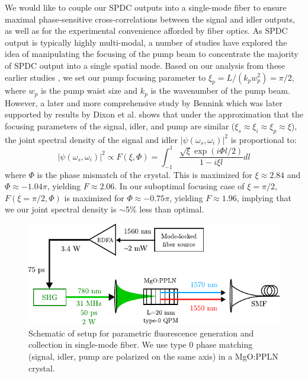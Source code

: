We would like to couple our SPDC outputs into a single-mode fiber to ensure maximal phase-sensitive cross-correlations between the signal and idler outputs, as well as for the experimental convenience afforded by fiber optics. As SPDC output is typically highly multi-modal, a number of studies \cite{ljunggren-focus,kurtsiefer-spdc,bovino-focus,bennink-focus,fedrizzi-focus,boyd-focus} have explored the idea of manipulating the focusing of the pump beam to concentrate the majority of SPDC output into a single spatial mode. Based on our analysis from these earlier studies \cite{legouet-interferometry}, we set our pump focusing parameter to $\xi_p = L/(k_p w_p^2) = \pi/2$, where $w_p$ is the pump waist size and $k_p$ is the wavenumber of the pump beam. However, a later and more comprehensive study by Bennink \cite{bennink-optimal} which was later supported by results by Dixon et al. \cite{dixon-heralding} shows that under the approximation that the focusing parameters of the signal, idler, and pump are similar ($\xi_s \approx \xi_i \approx \xi_p \approx \xi$), the joint spectral density of the signal and idler $|\psi(\omega_s, \omega_i)|^2$ is proportional to:
\begin{equation}
|\psi(\omega_s, \omega_i)|^2 \propto F(\xi,\Phi) = \int_{-1}^1 \frac{\sqrt{\xi} \exp(i\Phi l/2)}{1-i\xi l} dl
\end{equation}
where $\Phi$ is the phase mismatch of the crystal. This is maximized for $\xi \approx 2.84$ and $\Phi \approx -1.04\pi$, yielding $F \approx 2.06$. In our suboptimal focusing case of $\xi = \pi/2$, $F(\xi = \pi/2, \Phi)$ is maximized for $\Phi \approx -0.75\pi$, yielding $F \approx 1.96$, implying that we our joint spectral density is $\sim$5\% less than optimal.

\begin{figure}[t]
\begin{center}
\includegraphics[width=13cm]{figure-pcoct-setup-spdc.pdf}
\caption{Schematic of setup for parametric fluorescence generation and collection in single-mode fiber. We use type 0 phase matching (signal, idler, pump are polarized on the same axis) in a MgO:PPLN crystal.}
\label{figure:pcoct-setup-spdc}
\end{center}
\end{figure}

